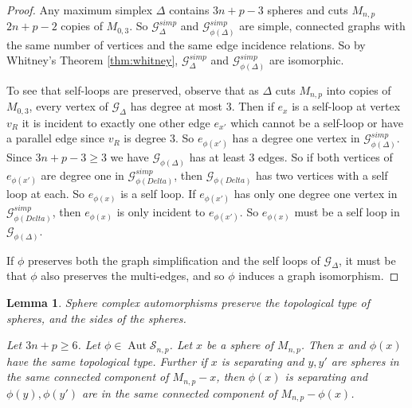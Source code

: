 \documentclass[11pt]{article}
\DeclareMathOperator{\aaut}{Aut}
\newtheorem{lemma}[theorem]{Lemma}
\theoremstyle{remark}
\theoremstyle{definition}
\begin{document}
\begin{proof}
  Any maximum simplex $\Delta$ contains
  $3n+p-3$ spheres and cuts $M_{n,p}$ $2n+p-2$ copies of  $M_{0,3}$.
  So $\mathcal G^{simp}_\Delta$ and $\mathcal G^{simp}_{\phi(\Delta)}$
  are simple, connected graphs with the same number of vertices and the same edge incidence relations.
  So by Whitney's Theorem  \ref{thm:whitney},
  $\mathcal G^{simp}_\Delta$ and $\mathcal G^{simp}_{\phi(\Delta)}$
  are isomorphic.

  To see that self-loops are preserved,
  observe that as $\Delta$ cuts $M_{n,p}$ into copies of $M_{0,3}$,
  every vertex of $\mathcal G_\Delta$ has degree at most 3.
  Then if $e_x$ is a self-loop at vertex $v_R$ it is incident to exactly one other edge $e_{x'}$ which cannot be a self-loop or have a parallel edge since $v_R$ is degree 3.
  So $e_{\phi(x')}$ has a degree one vertex in $\mathcal G^{simp}_{\phi(\Delta)}$.
  Since $3n+p-3\geq 3$ we have $\mathcal G_{\phi(\Delta)}$
  has at least 3 edges.
  So if both vertices of $e_{\phi(x')}$
  are degree one in $\mathcal G^{simp}_{\phi(Delta)}$, then $\mathcal G_{\phi(Delta)}$
  has two vertices with a self loop at each.
  So $e_{\phi(x)}$ is a self loop.
  If $e_{\phi(x')}$ has only one degree one vertex in $\mathcal G^{simp}_{\phi(Delta)}$, then $e_{\phi(x)}$ is only incident to $e_{\phi(x')}$. So $e_{\phi(x)}$ must be a self loop in  $\mathcal G_{\phi(\Delta)}$.

  If $\phi$ preserves both the graph simplification and the self loops of $\mathcal G_\Delta$, it must be that $\phi$ also preserves the multi-edges, and so $\phi$ induces a graph isomorphism.
\end{proof}

\begin{lemma}
  Sphere complex automorphisms preserve the topological type of spheres, and the sides of the spheres.

  Let $3n+p\geq 6$.
  Let $\phi \in \aaut \mathcal S_{n,p}$.
  Let $x$ be a sphere of $M_{n,p}$.
  Then $x$ and $\phi(x)$ have the same topological type.
  Further if $x$ is separating and $y,y'$ are spheres in the same connected component of $M_{n,p}-x$, then $\phi(x)$ is separating and $\phi(y),\phi(y')$ are
  in the same connected component of $M_{n,p}-\phi(x)$.
  \label{lemma:outspheretype}
\end{lemma}
\end{document}
